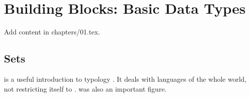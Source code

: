 \chapter{Building Blocks: Basic Data Types}
Add content in chapters/01.tex.

\section{Sets}
\citet{Comrie1981} is a useful introduction to typology . %
It deals with languages of the whole world, not restricting itself to . %
 was also an important figure. %
